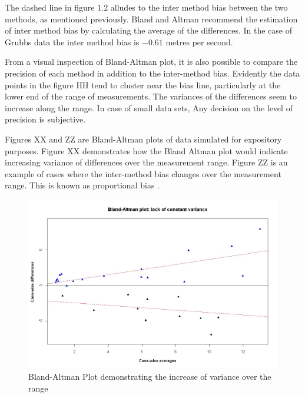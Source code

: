 \documentclass[12pt, a4paper]{report}
\begin{document}
The dashed line in figure 1.2 alludes to the inter method bias
between the two methods, as mentioned previously. Bland and Altman
recommend the estimation of inter method bias by calculating the
average of the differences. In the case of Grubbs data the inter
method bias is $-0.61$ metres per second.
\newpage

From a visual inspection of Bland-Altman plot, it is also possible
to compare the precision of each method in addition to the
inter-method bias.  Evidently the data points in the figure HH
tend to cluster near the bias line, particularly at the lower end
of the range of measurements. The variances of the differences
seem to increase along the range. In case of small data sets, Any
decision on the level of precision is subjective.

Figures XX and ZZ are Bland-Altman plots of data simulated for
expository purposes. Figure XX demonstrates how the Bland Altman
plot would indicate increasing variance of differences over the
measurement range. Figure ZZ is an example of cases where the
inter-method bias changes over the measurement range. This is
known as proportional bias \citep{ludbrook97}.

\newpage
\begin{figure}[h!]
\begin{center}
  \includegraphics[width=125mm]{BAFanEffect.jpeg}
  \caption{Bland-Altman Plot demonstrating the increase of variance over the range}\label{BAFanEffect}
\end{center}
\end{figure}
\newpage
\end{document}
